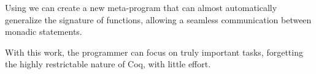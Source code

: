 Using \Mtac we can create a new meta-program that can almost automatically generalize the signature of functions, allowing a seamless communication between monadic statements.

With this work, the programmer can focus on truly important tasks, forgetting the highly restrictable nature of Coq, with little effort.

\vfill


\endgroup

\vfill
